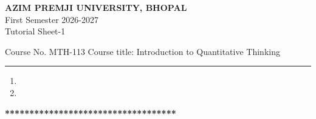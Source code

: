 \documentclass[a4paper,leqno,12pt]{amsart}
\begin{document}
\begin{center}
{{\textbf{ AZIM PREMJI UNIVERSITY, BHOPAL}\\
First Semester  2026-2027\\
Tutorial Sheet-1 }}
\end{center}

\noindent Course No. MTH-113 \hfill  Course title: Introduction to Quantitative Thinking
\vspace{.3cm}
\hrule 
\vspace{.3cm}


\begin{enumerate}
\setlength\itemsep{1em}
\item 
\item 


\end{enumerate}

\vspace*{0.2cm}
\begin{center}
{\bf ************************************}
\end{center}
\end{document}

